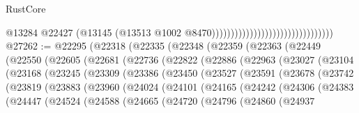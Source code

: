 \begin{lexlean}{RustCore}
\begin{coremodule}
                                                                @13284
                                                                @22427
                                                                (@13145
                                                                  (@13513
                                                                    @1002
                                                                    @8470))))))))))))))))))))))))))))))))
@27262 := @22295
    (@22318
      (@22335
        (@22348
          (@22359
            (@22363
              (@22449
                (@22550
                  (@22605
                    (@22681
                      (@22736
                        (@22822
                          (@22886
                            (@22963
                              (@23027
                                (@23104
                                  (@23168
                                    (@23245
                                      (@23309
                                        (@23386
                                          (@23450
                                            (@23527
                                              (@23591
                                                (@23678
                                                  (@23742
                                                    (@23819
                                                      (@23883
                                                        (@23960
                                                          (@24024
                                                            (@24101
                                                              (@24165
                                                                (@24242
                                                                  (@24306
                                                                    (@24383
                                                                      (@24447
                                                                        (@24524
                                                                          (@24588
                                                                            (@24665
                                                                              (@24720
                                                                                (@24796
                                                                                  (@24860
                                                                                    (@24937

\end{coremodule}
\end{lexlean}

